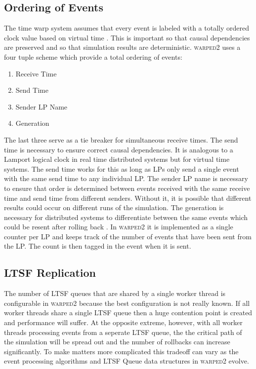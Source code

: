 \documentclass[11pt]{book}
\begin{document}
\subsection{Ordering of Events}

The time warp system assumes that every event is labeled with a totally ordered clock value
based on virtual time \cite{jefferson-85}. This is important so that causal dependencies
are preserved and so that simulation results are deterministic\cite{ronngren-99}.
\textsc{warped2} uses a four tuple scheme which provide a total ordering of events:

\begin{enumerate}
    \item Receive Time
    \item Send Time
    \item Sender LP Name
    \item Generation
\end{enumerate}

\noindent %
The last three serve as a tie breaker for simultaneous receive times. The send time is
necessary to ensure correct causal dependencies. It is analogous to a Lamport logical
clock\cite{lamport-78} in real time distributed systems but for virtual time systems. The
send time works for this as long as LPs only send a single event with the same send time
to any individual LP. The sender LP name is necessary to ensure that order is determined
between events received with the same receive time and send time from different senders.
Without it, it is possible that different results could occur on different runs of the
simulation\cite{ronngren-99}. The generation is necessary for distributed systems to
differentiate between the same events which could be resent after rolling back
\cite{ronngren-99}. In \textsc{warped2} it is implemented as a single counter per LP and
keeps track of the number of events that have been sent from the LP. The count is then
tagged in the event when it is sent.

\subsection{LTSF Replication}

The number of LTSF queues that are shared by a single worker thread is configurable in
\textsc{warped2} because the best configuration is not really known. If all worker threads
share a single LTSF queue then a huge contention point is created and performance will suffer.
At the opposite extreme, however, with all worker threads processing events from a seperate
LTSF queue, the the critical path of the simulation will be spread out and the number of
rollbacks can increase significantly. To make matters more complicated this tradeoff can
vary as the event processing algorithms and LTSF Queue data structures in \textsc{warped2}
evolve.
\end{document}
